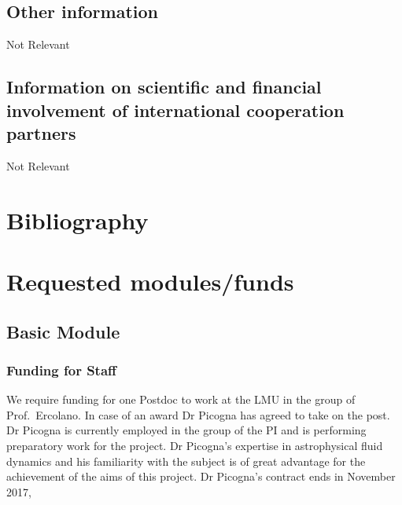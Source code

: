 \documentclass[10pt,fleqn,twoside]{article}
\begin{document}
\subsection{Other information}

Not Relevant

\subsection{Information on scientific and financial involvement of international cooperation partners}

Not Relevant

\section{Bibliography}

\todo{[Text]}


\section{Requested modules/funds}
\renewcommand{\leftmark}{\sc  Requested modules/funds}

\subsection{Basic Module}

\subsubsection{Funding for Staff}

We require funding for one Postdoc to work at the LMU in the group of
Prof.\ Ercolano. In case of an award Dr Picogna has agreed to
take on the post. Dr Picogna is currently employed in the group of the
PI and is performing preparatory work for the project. Dr Picogna's
expertise in astrophysical fluid dynamics and his familiarity with the
subject is of great advantage for the achievement of the aims of this
project. Dr Picogna's contract ends in November 2017, 
\end{document}
